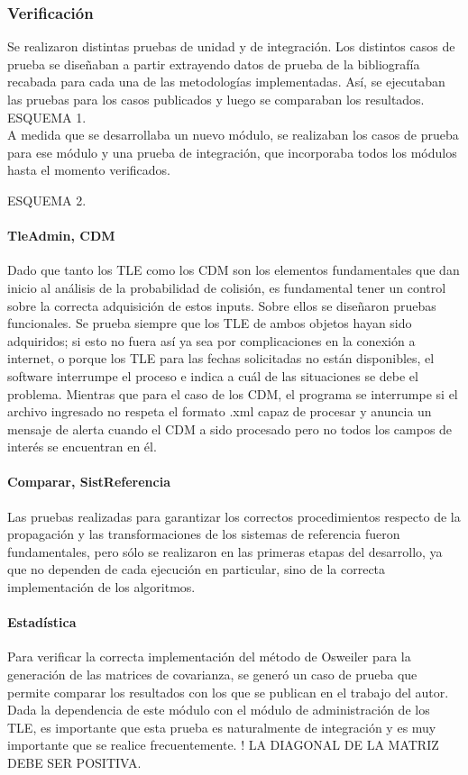 \subsubsection*{Verificaci\'on}
Se realizaron distintas pruebas de unidad y de integraci\'on.  
Los distintos casos de prueba se diseñaban a partir extrayendo datos de prueba de la bibliograf\'ia recabada para cada una de las metodolog\'ias implementadas. As\'i, se ejecutaban las pruebas para los casos publicados y luego se comparaban los resultados. 
ESQUEMA 1.\\

A medida que se desarrollaba un nuevo m\'odulo, se realizaban los casos de prueba para ese m\'odulo y una prueba de integraci\'on, que incorporaba todos los m\'odulos hasta el momento verificados.

ESQUEMA 2.\\

\paragraph*{TleAdmin, CDM}
Dado que tanto los TLE como los CDM son los elementos fundamentales que dan inicio al an\'alisis de la probabilidad de colisi\'on, es fundamental tener un control sobre la correcta adquisici\'on de estos inputs. Sobre ellos se diseñaron pruebas funcionales. Se prueba siempre que los TLE de ambos objetos hayan sido adquiridos; si esto no fuera as\'i ya sea por complicaciones en la conexi\'on a internet, o porque los TLE para las fechas solicitadas no est\'an disponibles, el software interrumpe el proceso e indica a cu\'al de las situaciones se debe el problema. Mientras que para el caso de los CDM, el programa se interrumpe si el archivo ingresado no respeta el formato .xml capaz de procesar y anuncia un mensaje de alerta cuando el CDM a sido procesado pero no todos los campos de inter\'es se encuentran en \'el. 

\paragraph*{Comparar, SistReferencia}
Las pruebas realizadas para garantizar los correctos procedimientos respecto de la propagaci\'on y las transformaciones de los sistemas de referencia fueron fundamentales, pero s\'olo se realizaron en las primeras etapas del desarrollo, ya que no dependen de cada ejecuci\'on en particular, sino de la correcta implementaci\'on de los algoritmos.  

\paragraph*{Estad\'istica}
Para verificar la correcta implementaci\'on del m\'etodo de Osweiler para la generaci\'on de las matrices de covarianza, se gener\'o un caso de prueba que permite comparar los resultados con los que se publican en el trabajo del autor. Dada la dependencia de este m\'odulo con el m\'odulo de administraci\'on de los TLE, es importante que esta prueba es naturalmente de integraci\'on y es muy importante que se realice frecuentemente. ! LA DIAGONAL DE LA MATRIZ DEBE SER POSITIVA. 

